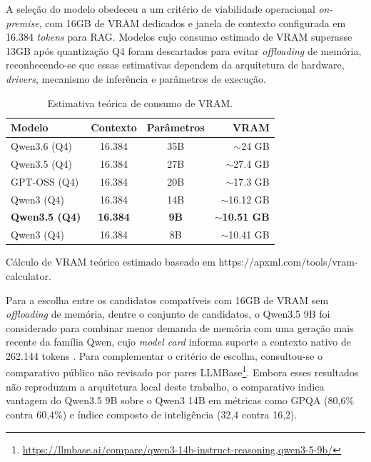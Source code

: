 \documentclass[12pt]{article}
\begin{document}
A seleção do modelo obedeceu a um critério de viabilidade operacional \textit{on-premise}, com 16GB de VRAM dedicados e janela de contexto configurada em 16.384 \textit{tokens} para RAG.
Modelos cujo consumo estimado de VRAM superasse 13GB após quantização Q4 foram descartados para evitar \textit{offloading} de memória, reconhecendo-se que essas estimativas dependem da arquitetura de hardware, \textit{drivers}, mecanismo de inferência e parâmetros de execução.

\begin{table}[t!]
  \centering
  \begin{threeparttable}
  \caption{Estimativa teórica de consumo de VRAM.}
  \label{tab:latency_compatibility}
  \begin{tabular}{l c c r}
    \toprule
    \textbf{Modelo}       & \textbf{Contexto} & \textbf{Parâmetros} & \textbf{VRAM}           \\
    \midrule
    Qwen3.6 (Q4)          & 16.384            & 35B                 & $\sim$24 GB             \\
    Qwen3.5 (Q4)          & 16.384            & 27B                 & $\sim$27.4 GB           \\
    GPT-OSS (Q4)          & 16.384            & 20B                 & $\sim$17.3 GB           \\
    Qwen3 (Q4)            & 16.384            & 14B                 & $\sim$16.12 GB          \\
    \textbf{Qwen3.5 (Q4)} & \textbf{16.384}   & \textbf{9B}         & \textbf{$\sim$10.51 GB} \\
    Qwen3 (Q4)            & 16.384            & 8B                  & $\sim$10.41 GB          \\
    \bottomrule
  \end{tabular}
  \begin{tablenotes}
    \footnotesize
    \item[*] Cálculo de VRAM teórico estimado baseado em https://apxml.com/tools/vram-calculator.
  \end{tablenotes}
  \end{threeparttable}
\end{table}

Para a escolha entre os candidatos compatíveis com 16GB de VRAM sem \textit{offloading} de memória, dentre o conjunto de candidatos, o Qwen3.5 9B foi considerado para combinar menor demanda de memória com uma geração mais recente da família Qwen, cujo \textit{model card} informa suporte a contexto nativo de 262.144 tokens \cite{Qwen35ModelCard2026}.
Para complementar o critério de escolha, consultou-se o comparativo público não revisado por pares LLMBase\footnote{\url{https://llmbase.ai/compare/qwen3-14b-instruct-reasoning,qwen3-5-9b/}}. Embora esses resultados não reproduzam a arquitetura local deste trabalho, o comparativo indica vantagem do Qwen3.5 9B sobre o Qwen3 14B em métricas como GPQA (80,6\% contra 60,4\%) e índice composto de inteligência (32,4 contra 16,2).
\end{document}
